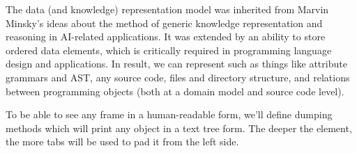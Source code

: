 \label{frame}\secdown

\clearpage

The data (and knowledge) representation model was inherited from Marvin Minsky's
ideas about the method of generic knowledge representation and reasoning in
AI-related applications. It was extended by an ability to store ordered data
elements, which is critically required in programming language design and
applications. In result, we can represent such as things like attribute grammars
and AST, any source code, files and directory structure, and relations between
programming objects (both at a domain model and source code level).


To be able to see any frame in a human-readable form, we'll define dumping
methods which will print any object in a text tree form. The deeper the element,
the more tabs will be used to pad it from the left side.








\secup
